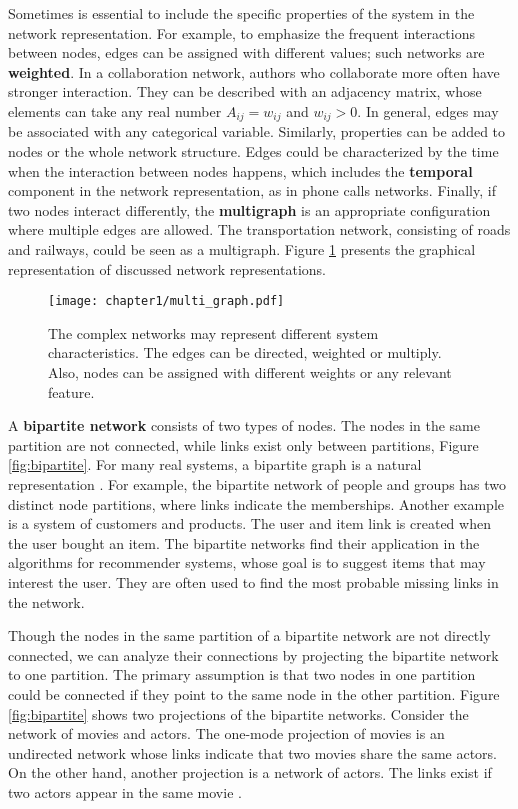 Sometimes is essential to include the specific properties of the system in the network representation. For example, to emphasize the frequent interactions between nodes, edges can be assigned with different values; such networks are \textbf{weighted}. In a collaboration network, authors who collaborate more often have stronger interaction. They can be described with an adjacency matrix, whose elements can take any real number $A_{ij}=w_{ij}$ and $w_{ij}>0$. In general, edges may be associated with any categorical variable. Similarly, properties can be added to nodes or the whole network structure. Edges could be characterized by the time when the interaction between nodes happens, which includes the \textbf{temporal} component in the network representation, as in phone calls networks. Finally, if two nodes interact differently, the \textbf{multigraph} is an appropriate configuration where multiple edges are allowed. The transportation network, consisting of roads and railways, could be seen as a multigraph. Figure \ref{fig:multigraph} presents the graphical representation of discussed network representations.


\begin{figure}[h]
	\centering
	\texttt{[image: chapter1/multi\_graph.pdf]} 
	\caption[Different network representations.]{The complex networks may represent different system characteristics. The edges can be directed, weighted or multiply. Also, nodes can be assigned with different weights or any relevant feature.}
	\label{fig:multigraph}
\end{figure}

A \textbf{bipartite network} consists of two types of nodes. The nodes in the same partition are not connected, while links exist only between partitions, Figure \ref{fig:bipartite}. For many real systems, a bipartite graph is a natural representation \cite{barabasi2016network, latora2017complex}. For example, the bipartite network of people and groups has two distinct node partitions, where links indicate the memberships. Another example is a system of customers and products. The user and item link is created when the user bought an item. The bipartite networks find their application in the algorithms for recommender systems, whose goal is to suggest items that may interest the user. They are often used to find the most probable missing links in the network. 

Though the nodes in the same partition of a bipartite network are not directly connected,  we can analyze their connections by projecting the bipartite network to one partition. The primary assumption is that two nodes in one partition could be connected if they point to the same node in the other partition. Figure \ref{fig:bipartite} shows two projections of the bipartite networks. Consider the network of movies and actors. The one-mode projection of movies is an undirected network whose links indicate that two movies share the same actors. On the other hand, another projection is a network of actors. The links exist if two actors appear in the same movie \cite{newman2010, barabasi2016network}.

